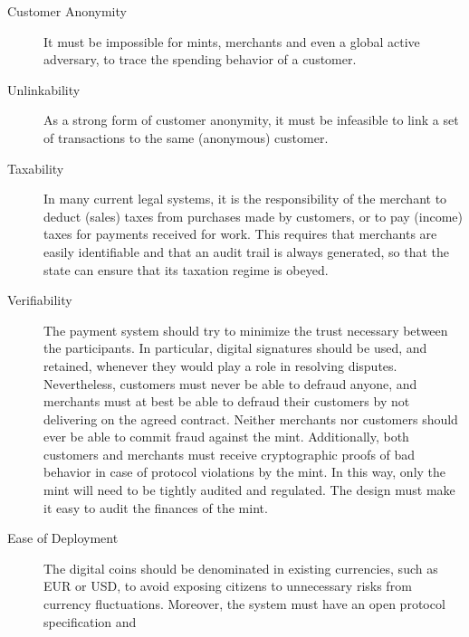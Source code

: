 \documentclass{llncs}
\begin{document}
\begin{description}
  \item[Customer Anonymity]
    It must be impossible for mints, merchants and even a global active
    adversary, to trace the spending behavior of a customer.
  \item[Unlinkability]
    As a strong form of customer anonymity, it must be infeasible to
    link a set of transactions to the same (anonymous) customer.
  \item[Taxability]
    In many current legal systems, it is the responsibility of the merchant
    to deduct (sales) taxes from purchases made by customers, or to
    pay (income) taxes for payments received for work.
    This requires that merchants are easily identifiable and that
    an audit trail is always generated, so that the state can ensure that its
    taxation regime is obeyed.
  \item[Verifiability]
    The payment system should try to minimize the trust necessary between
    the participants.  In particular, digital signatures should be used,
    and retained, whenever they would play a role in resolving disputes. %
    Nevertheless, customers must never be able to defraud anyone, and
    merchants must at best be able to defraud their customers by not
    delivering on the agreed contract.  Neither merchants nor customers
    should ever be able to commit fraud against the mint.  Additionally,
    both customers and merchants must receive cryptographic proofs of
    bad behavior in case of protocol violations by the mint.
    In this way, only the mint will need to be tightly audited and regulated.
    The design must make it easy to audit the finances of the mint.
  \item[Ease of Deployment] %
    The digital coins should be denominated in existing currencies,
    such as EUR or USD, to avoid exposing citizens to unnecessary risks
    from currency fluctuations.
    Moreover, the system must have an open protocol specification and

\end{description}
\end{document}
